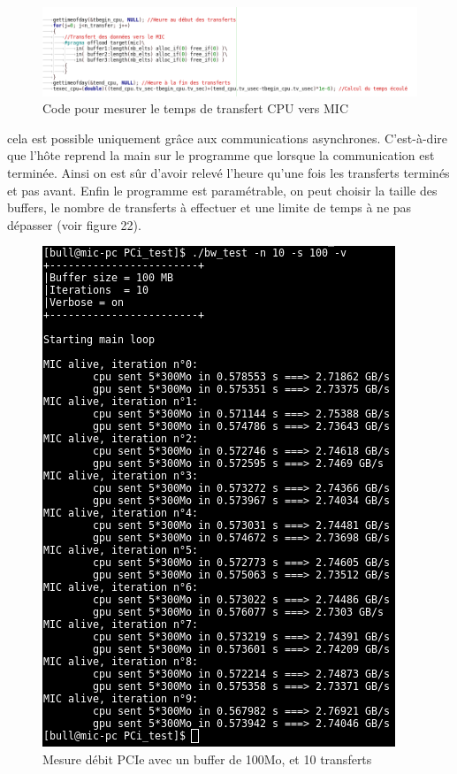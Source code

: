 \documentclass[11pt]{article}
\begin{document}
					\begin{figure}
					\begin{center}
					\includegraphics[scale=0.5]{code.png}
					\caption{Code pour mesurer le temps de transfert CPU vers MIC}
					\end{center}
					\end{figure}
					cela est possible uniquement grâce aux communications asynchrones. C'est-à-dire que l'hôte reprend la main 
					sur le programme que lorsque la communication est terminée. Ainsi on est sûr d'avoir relevé l'heure qu'une 
					fois les transferts terminés et pas avant. Enfin le programme est paramétrable, on peut choisir la taille 
					des buffers, le nombre de transferts à effectuer et une limite de temps à ne pas dépasser (voir figure 22).
					\begin{figure}
					\begin{center}
					\includegraphics[scale=0.4]{bwtest.png}
					\caption{Mesure débit PCIe avec un buffer de 100Mo, et 10 transferts}
					\end{center}
					\end{figure}
\end{document}
